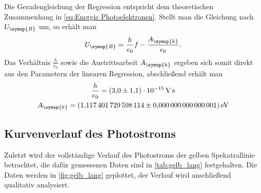Die Geradengleichung der Regression entspricht dem theoretischen Zusammenhang in \autoref{eq:Energie Photoelektronen}.
Stellt man die Gleichung nach $U_{\symup{B}}$ um, so erhält man
\begin{equation*}
  U_{\symup{B}} = \frac{h}{e_0}f - \frac{A_{\symup{k}}}{e_0}.
\end{equation*}
Das Verhältnis $\frac{h}{e_0}$ sowie die Austrittsarbeit $A_{\symup{k}}$ ergeben sich somit direkt aus den
Parametern der linearen Regression, abschließend erhält man
\begin{gather*}
  \frac{h}{e_0}=\qty{3.0(1.1)e-15}{\volt\second} \\
  A_{\symup{k}}=\qty{1.117401729598114+-0.000000000000001}{\electronvolt}
\end{gather*}

\subsection{Kurvenverlauf des Photostroms}

Zuletzt wird der vollständige Verlauf des Photostroms der gelben Spekatrallinie betrachtet,
die dafür gemessenen Daten sind in \autoref{tab:gelb_lang} festgehalten.
Die Daten werden in \autoref{fig:gelb_lang} geplottet, der Verlauf wird anschließend qualitativ analysiert.

